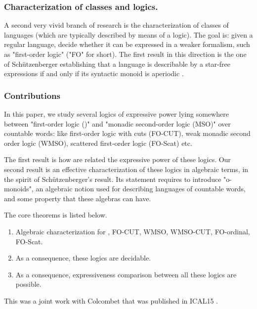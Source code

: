 \documentclass[a4paper,10pt]{article}
\theoremstyle{open}
\newcommand{\focut}{FO-CUT}
\newcommand{\foordinal}{FO-ordinal}
\newcommand{\fofinite}{WMSO}
\newcommand{\fofinitecut}{WMSO-CUT}
\newcommand{\foscattered}{FO-Scat}
\newcommand{\mso}{MSO}
\begin{document}
\subsubsection{Characterization of classes and logics.} A second very vivid branch of research is the characterization of classes of languages (which are typically described by means of a logic). The goal is: given a regular language, decide whether it can be expressed in a weaker formalism, such as "first-order logic" ("FO" for short). The first result in this direction is the one of Schützenberger establishing that a language is describable by a star-free expressions if and only if its syntactic monoid is aperiodic \cite{Schutzenberger65}.

\subsubsection{Contributions}
In this paper, we study several logics of expressive power lying somewhere between "first-order logic (\fo)" and "monadic second-order logic (\mso)" over countable words: like first-order logic with cuts (\focut), weak monadic second order logic (\fofinite), scattered first-order logic (\foscattered) etc.

The first result is how are related the expressive power of these logics.
Our second result is an effective characterization of these logics in algebraic terms, in the spirit of Schützenberger's result.
Its statement requires to introduce "o-monoids", an algebraic notion used for describing languages of countable words, and
some property that these algebras can have.
\begin{theorem}
The core theorems is listed below.
\begin{enumerate}
 \item Algebraic characterization for \fo, \focut, \fofinite, \fofinitecut, \foordinal, \foscattered.
 \item As a consequence, these logics are decidable.
 \item As a consequence, expressiveness comparison between all these logics are possible.
 \end{enumerate}
\end{theorem}

This was a joint work with Colcombet that was published in ICAL15 \cite{icalp15}.
\end{document}
